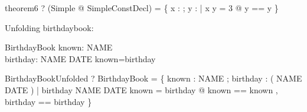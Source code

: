 \begin{theorem}{theorem6}
  \vdash? (\exists Simple @ SimpleConstDecl) =
    \{ x : \arithmos ; y : \arithmos |
       x \in \nat \land y = 3 @ \lblot y == y \rblot \}
\end{theorem}


Unfolding birthdaybook:

\begin{zed}\end{zed}

\begin{schema}{BirthdayBook}
    known: \power NAME \\
    birthday: NAME \pfun DATE
\where
    known=\dom birthday
\end{schema}

\begin{theorem}{BirthdayBookUnfolded}
  \vdash? BirthdayBook =
    \{ known : \power NAME ; birthday : \power ( NAME \cross DATE ) |
        birthday \in NAME \pfun DATE \land known = \dom birthday @
    \lblot known == known , birthday == birthday \rblot \}
\end{theorem}
